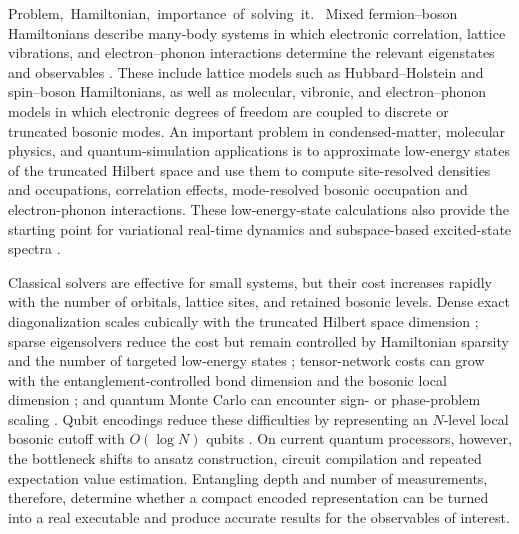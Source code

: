 \documentclass[
  reprint,
  amsmath,
  amssymb,
  aps,
  pra,
  nofootinbib,
  superscriptaddress,
  floatfix
]{revtex4-2}
\newcommand{\tentative}[1]{\textcolor{red!70!black}{#1}}
\newcommand{\structlabel}[1]{\noindent\mbox{\tentative{#1.}}~}
\begin{document}
\structlabel{Problem, Hamiltonian, importance of solving it}
Mixed fermion--boson Hamiltonians describe many-body systems in which electronic correlation, lattice vibrations, and electron--phonon interactions determine the relevant eigenstates and observables \cite{Hubbard1963,Holstein1959a,Holstein1959b}. These include lattice models such as Hubbard--Holstein and spin--boson Hamiltonians, as well as molecular, vibronic, and electron--phonon models in which electronic degrees of freedom are coupled to discrete or truncated bosonic modes. An important problem in condensed-matter, molecular physics, and quantum-simulation applications is to approximate low-energy states of the truncated Hilbert space and use them to compute site-resolved densities and occupations, correlation effects, mode-resolved bosonic occupation and electron-phonon interactions. These low-energy-state calculations also provide the starting point for variational real-time dynamics and subspace-based excited-state spectra \cite{LiBenjamin2017VQS,Yuan2019VQS,McClean2017QSE}.

Classical solvers are effective for small systems, but their cost increases rapidly with the number of  orbitals, lattice sites, and retained bosonic levels.  Dense exact diagonalization scales cubically with the truncated Hilbert space dimension \cite{Weisse2008}; sparse eigensolvers reduce the cost but remain controlled by Hamiltonian sparsity and the number of targeted low-energy states \cite{Schollwock2011}; tensor-network costs can grow with the entanglement-controlled bond dimension and the bosonic local dimension \cite{Schollwock2011}; and quantum Monte Carlo can encounter sign- or phase-problem scaling \cite{Troyer2005}. Qubit encodings reduce these difficulties by representing an \(N\)-level local bosonic cutoff with \(O(\log N)\) qubits \cite{Sawaya2020,Li2023}. On current quantum processors, however, the bottleneck shifts to ansatz construction, circuit compilation and repeated expectation value estimation. Entangling depth and number of measurements, therefore, determine whether a compact encoded representation can be turned into a real executable and produce accurate results for the observables of interest.
\end{document}
